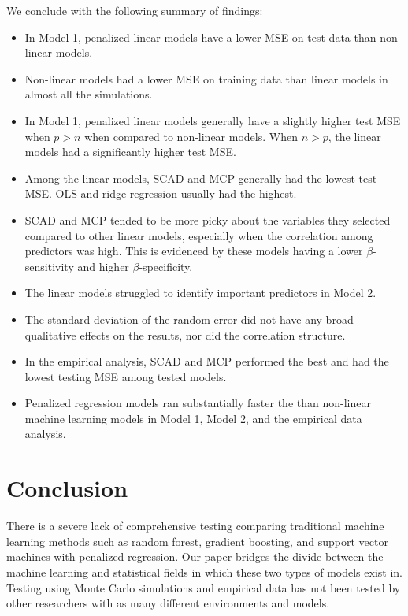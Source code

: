 \documentclass{article}
\begin{document}
	We conclude with the following summary of findings:
	\begin{itemize}
		\item In Model 1, penalized linear models have a lower MSE on test data than non-linear models.
		\item Non-linear models had a lower MSE on training data than linear models in almost all the simulations.
		\item In Model 1, penalized linear models generally have a slightly higher test MSE when $p > n$ when compared to non-linear models. When $n > p$, the linear models had a significantly higher test MSE.
		\item Among the linear models, SCAD and MCP generally had the lowest test MSE. OLS and ridge regression usually had the highest.
		\item SCAD and MCP tended to be more picky about the variables they selected compared to other linear models, especially when the correlation among predictors was high. This is evidenced by these models having a lower $\beta$-sensitivity and higher $\beta$-specificity.
		\item The linear models struggled to identify important predictors in Model 2.
		\item The standard deviation of the random error did not have any broad qualitative effects on the results, nor did the correlation structure.
		\item In the empirical analysis, SCAD and MCP performed the best and had the lowest testing MSE among tested models.
		\item Penalized regression models ran substantially faster the than non-linear machine learning models in Model 1, Model 2, and the empirical data analysis.
	\end{itemize}
	
	
	\section{Conclusion}\label{sec:conclusion}
	
	There is a severe lack of comprehensive testing comparing traditional machine learning methods such as random forest, gradient boosting, and support vector machines with penalized regression. Our paper bridges the divide between the machine learning and statistical fields in which these two types of models exist in. Testing using Monte Carlo simulations and empirical data has not been tested by other researchers with as many different environments and models.
	
\end{document}
